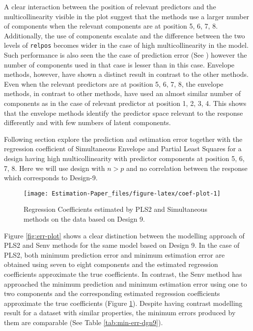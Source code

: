 \documentclass[12pt,3p,authoryear]{elsarticle}
\begin{document}
A clear interaction between the position of relevant predictors and the
multicollinearity visible in the plot suggest that the methods use a
larger number of components when the relevant components are at position
5, 6, 7, 8. Additionally, the use of components escalate and the
difference between the two levels of \texttt{relpos} becomes wider in
the case of high multicollinearity in the model. Such performance is
also seen the the case of prediction error (See \citet{rimal2019pred})
however the number of components used in that case is lesser than in
this case. Envelope methods, however, have shown a distinct result in
contrast to the other methods. Even when the relevant predictors are at
position 5, 6, 7, 8, the envelope methods, in contrast to other methods,
have used an almost similar number of components as in the case of
relevant predictor at position 1, 2, 3, 4. This shows that the envelope
methods identify the predictor space relevant to the response
differently and with few numbers of latent components.

Following section explore the prediction and estimation error together
with the regression coefficient of Simultaneous Envelope and Partial
Least Squares for a design having high multicollinearity with predictor
components at position 5, 6, 7, 8. Here we will use design with \(n>p\)
and no correlation between the response which corresponds to Design-9.

\begin{figure}
\texttt{[image: Estimation-Paper\_files/figure-latex/coef-plot-1]} \caption{Regression Coefficients estimated by PLS2 and Simultaneous methods on the data based on Design 9.}\label{fig:coef-plot}
\end{figure}

Figure \ref{fig:err-plot} shows a clear distinction between the
modelling approach of PLS2 and Senv methods for the same model based on
Design 9. In the case of PLS2, both minimum prediction error and minimum
estimation error are obtained using seven to eight components and the
estimated regression coefficients approximate the true coefficients. In
contrast, the Senv method has approached the minimum prediction and
minimum estimation error using one to two components and the
corresponding estimated regression coefficients approximate the true
coefficients (Figure \ref{fig:coef-plot}). Despite having contrast
modelling result for a dataset with similar properties, the minimum
errors produced by them are comparable (See Table
\ref{tab:min-err-dgn9}).
\end{document}
